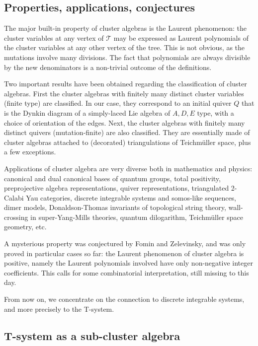 \documentclass[12pt]{amsart}
\numberwithin{equation}{section}
\begin{document}
\subsection{Properties, applications, conjectures}

The major built-in property of cluster algebras is the Laurent phenomenon:
the cluster variables at any vertex of $\mathcal T$ may be expressed as Laurent polynomials of the cluster
variables at any other vertex of the tree. This is not obvious, as the mutations involve many divisions.
The fact that polynomials are always divisible by the new denominators is a
non-trivial  outcome of the definitions.

Two important results have been obtained regarding the classification of cluster algebras. First the 
cluster algebras with finitely many distinct cluster variables (finite type) are classified\cite{FZII}. In our case,
they correspond to an initial quiver $Q$ that is the Dynkin diagram of a simply-laced Lie algebra 
of $A,D,E$ type, with a choice of orientation of the edges. Next, the cluster algebras with
finitely many distinct quivers (mutation-finite) are also classified\cite{FST}. They are essentially made of 
cluster algebras attached to (decorated) triangulations of Teichm\"uller space, plus a few exceptions.

Applications of cluster algebra are very diverse both in mathematics and physics: 
canonical and dual canonical bases of quantum groups,
total positivity, preprojective algebra representations, quiver representations, triangulated 2-Calabi Yau categories,
discrete integrable systems and somos-like sequences, dimer models,
Donaldson-Thomas invariants of topological string theory,
wall-crossing in super-Yang-Mills theories, quantum dilogarithm, Teichm\"uller space geometry, etc.

A mysterious property was conjectured by Fomin and Zelevinsky\cite{FZI}, and was only proved in particular cases so far:
the Laurent phenomenon of cluster algebra is positive, namely the Laurent polynomials involved have only
non-negative integer coefficients. This calls for some combinatorial interpretation, still missing to this day.

From now on, we concentrate on the connection to discrete integrable systems, and more precisely to the T-system.

\subsection{T-system as a sub-cluster algebra}
\end{document}
